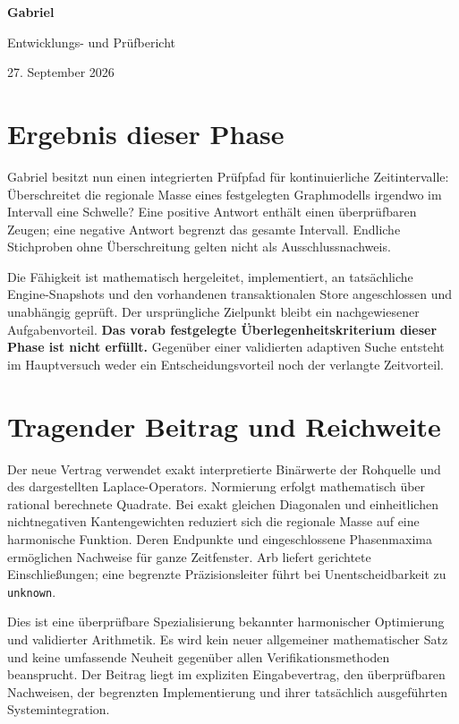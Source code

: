 \documentclass[11pt,a4paper]{article}
\begin{document}
\begin{center}
{\LARGE\bfseries Gabriel}\par\vspace{5pt}
{\large Entwicklungs- und Prüfbericht}\par\vspace{5pt}
27. September 2026
\end{center}
\section*{Ergebnis dieser Phase}
Gabriel besitzt nun einen integrierten Prüfpfad für kontinuierliche Zeitintervalle: Überschreitet die regionale Masse eines festgelegten Graphmodells irgendwo im Intervall eine Schwelle? Eine positive Antwort enthält einen überprüfbaren Zeugen; eine negative Antwort begrenzt das gesamte Intervall. Endliche Stichproben ohne Überschreitung gelten nicht als Ausschlussnachweis.

Die Fähigkeit ist mathematisch hergeleitet, implementiert, an tatsächliche Engine-Snapshots und den vorhandenen transaktionalen Store angeschlossen und unabhängig geprüft. Der ursprüngliche Zielpunkt bleibt ein nachgewiesener Aufgabenvorteil. \textbf{Das vorab festgelegte Überlegenheitskriterium dieser Phase ist nicht erfüllt.} Gegenüber einer validierten adaptiven Suche entsteht im Hauptversuch weder ein Entscheidungsvorteil noch der verlangte Zeitvorteil.

\section*{Tragender Beitrag und Reichweite}
Der neue Vertrag verwendet exakt interpretierte Binärwerte der Rohquelle und des dargestellten Laplace-Operators. Normierung erfolgt mathematisch über rational berechnete Quadrate. Bei exakt gleichen Diagonalen und einheitlichen nichtnegativen Kantengewichten reduziert sich die regionale Masse auf eine harmonische Funktion. Deren Endpunkte und eingeschlossene Phasenmaxima ermöglichen Nachweise für ganze Zeitfenster. Arb liefert gerichtete Einschließungen; eine begrenzte Präzisionsleiter führt bei Unentscheidbarkeit zu \texttt{unknown}.

Dies ist eine überprüfbare Spezialisierung bekannter harmonischer Optimierung und validierter Arithmetik. Es wird kein neuer allgemeiner mathematischer Satz und keine umfassende Neuheit gegenüber allen Verifikationsmethoden beansprucht. Der Beitrag liegt im expliziten Eingabevertrag, den überprüfbaren Nachweisen, der begrenzten Implementierung und ihrer tatsächlich ausgeführten Systemintegration.
\end{document}
